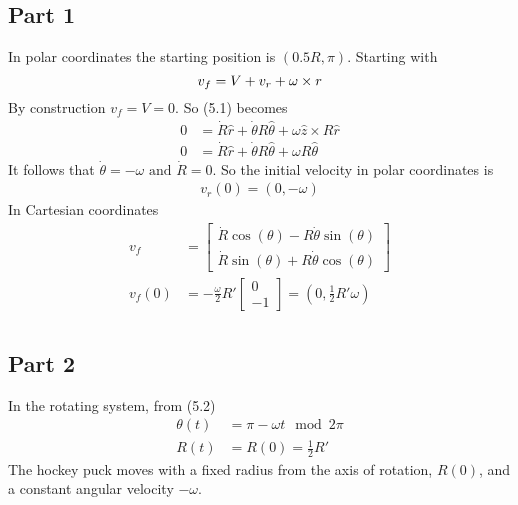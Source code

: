 \subsection{Part 1}
In polar coordinates the starting position is $(0.5R,\pi)$. Starting with
\begin{equation}
    v_f = V + v_r + \omega \times r\\
\end{equation}
By construction $v_f = V = 0$. So (5.1) becomes
\begin{equation}
\begin{split}
    0 &= \dot{R}\hat{r} +\dot{\theta} R\hat{\theta} + \omega \hat{z} \times R\hat{r}\\
    0& = \dot{R}\hat{r} +\dot{\theta} R\hat{\theta} + \omega R\hat{\theta}
\end{split}
\end{equation}
It follows that $\dot{\theta} = -\omega \textrm{ and } \dot{R} = 0$. So the initial velocity in polar coordinates is
\begin{equation}
\begin{split}
    v_r(0) = (0, -\omega)
\end{split}
\end{equation}
In Cartesian coordinates
\begin{equation}
    \begin{split}
        v_f &= \begin{bmatrix}
\dot{R}\cos(\theta) - R \dot{\theta} \sin(\theta) \\
\dot{R}\sin(\theta) + R \dot{\theta} \cos(\theta) 
\end{bmatrix}\\
        v_f(0) &= -\frac{\omega}{2}R' \begin{bmatrix}
0 \\
-1 
\end{bmatrix}= (0,\frac{1}{2}R'\omega)\\
    \end{split}
\end{equation}

\subsection{Part 2}
In the rotating system, from (5.2)
\begin{equation}
    \begin{split}
        \theta(t) &= \pi - \omega t \mod 2\pi\\
        R(t) &= R(0) = \frac{1}{2}R'
    \end{split}
\end{equation}
The hockey puck moves with a fixed radius from the axis of rotation, $R(0)$, and a constant angular velocity $-\omega$.

